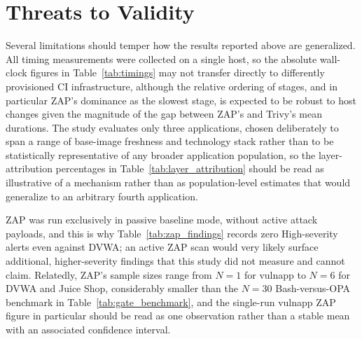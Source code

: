 \documentclass[conference]{IEEEtran}
\begin{document}
\section{Threats to Validity}
\label{sec:validity}

Several limitations should temper how the results reported above are generalized. All timing measurements were collected on a single host, so the absolute wall-clock figures in Table~\ref{tab:timings} may not transfer directly to differently provisioned CI infrastructure, although the relative ordering of stages, and in particular ZAP's dominance as the slowest stage, is expected to be robust to host changes given the magnitude of the gap between ZAP's and Trivy's mean durations. The study evaluates only three applications, chosen deliberately to span a range of base-image freshness and technology stack rather than to be statistically representative of any broader application population, so the layer-attribution percentages in Table~\ref{tab:layer_attribution} should be read as illustrative of a mechanism rather than as population-level estimates that would generalize to an arbitrary fourth application.

ZAP was run exclusively in passive baseline mode, without active attack payloads, and this is why Table~\ref{tab:zap_findings} records zero High-severity alerts even against DVWA; an active ZAP scan would very likely surface additional, higher-severity findings that this study did not measure and cannot claim. Relatedly, ZAP's sample sizes range from $N=1$ for vulnapp to $N=6$ for DVWA and Juice Shop, considerably smaller than the $N=30$ Bash-versus-OPA benchmark in Table~\ref{tab:gate_benchmark}, and the single-run vulnapp ZAP figure in particular should be read as one observation rather than a stable mean with an associated confidence interval.
\end{document}
